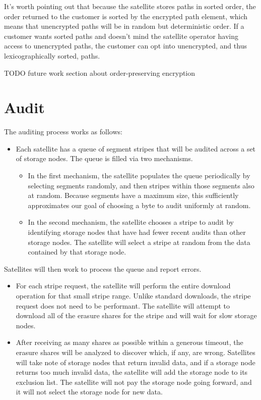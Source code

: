 \documentclass[11pt,fleqn,openany]{book}
\newcommand{\todo}[1]{{\color{red} TODO #1 }}
\begin{document}
It's worth pointing out that because the satellite stores paths in sorted
order, the order returned to the customer is sorted by the encrypted
path element, which means that unencrypted paths will be in random but
deterministic order. If a customer wants sorted paths and doesn't mind the
satellite operator having access to unencrypted paths, the customer can opt
into unencrypted, and thus lexicographically sorted, paths.

\todo{future work section about order-preserving encryption}

\section{Audit}

The auditing process works as follows:

\begin{itemize}
\item Each satellite has a queue of segment stripes that will be audited across
  a set of storage nodes. The queue is filled via two mechanisms.
  \begin{itemize}
  \item In the first mechanism, the satellite populates the queue periodically
    by selecting segments randomly, and then stripes within those segments also
    at random. Because segments have a maximum size, this sufficiently
    approximates our goal of choosing a byte to audit uniformly at random.
  \item In the second mechanism, the satellite chooses a stripe to audit by
    identifying storage nodes that have had fewer recent audits than other
    storage nodes. The satellite will select a stripe at random from the data
    contained by that storage node.
  \end{itemize}
\end{itemize}

Satellites will then work to process the queue and report errors.
\begin{itemize}
\item For each stripe request, the satellite will perform the entire download
  operation for that small stripe range. Unlike standard downloads, the stripe
  request does not need to be performant. The satellite will attempt to
  download all of the erasure shares for the stripe and will wait for slow
  storage nodes.
\item After receiving as many shares as possible within a generous timeout,
  the erasure shares will be analyzed to discover which, if any, are wrong.
  Satellites will take note of storage nodes that return invalid data, and if a
  storage node returns too much invalid data, the satellite will add the
  storage node to its exclusion list. The satellite will not pay the storage
  node going forward, and it will not select the storage node for new data.
\end{itemize}
\end{document}
